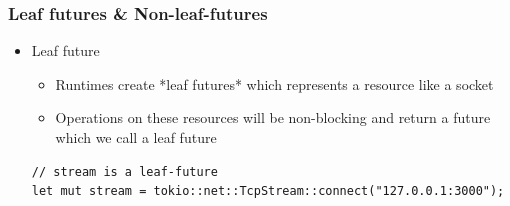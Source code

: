 \begin{frame}[fragile]
    \frametitle{Leaf futures \& Non-leaf-futures}
% 
% 
% 
    \begin{itemize}
        \item Leaf future
    	\begin{itemize}
    	    \item Runtimes create *leaf futures* which represents a resource like a socket
    	    \item Operations on these resources will be non-blocking and return a future which we call a leaf future
    	\end{itemize}
\begin{block}{}
\begin{verbatim}
// stream is a leaf-future
let mut stream = tokio::net::TcpStream::connect("127.0.0.1:3000");
\end{verbatim}
\end{block}

\end{itemize}
% 
\end{frame}



